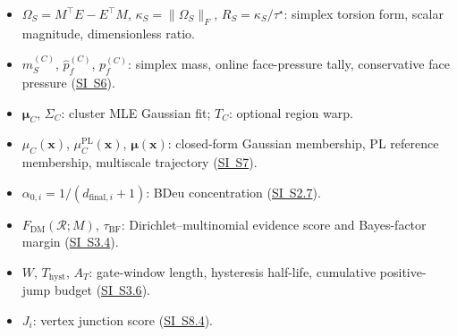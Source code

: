 \documentclass[11pt]{article}
\theoremstyle{definition}
\theoremstyle{plain}
\begin{document}
\begin{itemize}[leftmargin=1.5em]
    \item $\Omega_S=M^\top E-E^\top M$, $\kappa_S=\|\Omega_S\|_F$, $R_S=\kappa_S/\tau^\star$: simplex torsion form, scalar magnitude, dimensionless ratio.
    \item $m_S^{(C)}$, $\hat p_f^{(C)}$, $p_f^{(C)}$: simplex mass, online face-pressure tally, conservative face pressure (\hyperref[sec:si-dual-flow]{SI~S6}).
    \item $\boldsymbol\mu_C$, $\Sigma_C$: cluster MLE Gaussian fit; $T_C$: optional region warp.
    \item $\mu_C(\mathbf x)$, $\mu_C^{\mathrm{PL}}(\mathbf x)$, $\boldsymbol\mu(\mathbf x)$: closed-form Gaussian membership, PL reference membership, multiscale trajectory (\hyperref[sec:si-memberships]{SI~S7}).
    \item $\alpha_{0,i}=1/(d_{\mathrm{final},i}+1)$: BDeu concentration (\hyperref[sec:si-bdeu-prior]{SI~S2.7}).
    \item $F_{\mathrm{DM}}(\mathcal R;M)$, $\tau_{\mathrm{BF}}$: Dirichlet--multinomial evidence score and Bayes-factor margin (\hyperref[sec:si-dm-evidence]{SI~S3.4}).
    \item $W$, $T_{\mathrm{hyst}}$, $A_T$: gate-window length, hysteresis half-life, cumulative positive-jump budget (\hyperref[sec:si-gate-cadence]{SI~S3.6}).
    \item $J_i$: vertex junction score (\hyperref[sec:si-junction-freeze]{SI~S8.4}).
\end{itemize}



\end{document}
